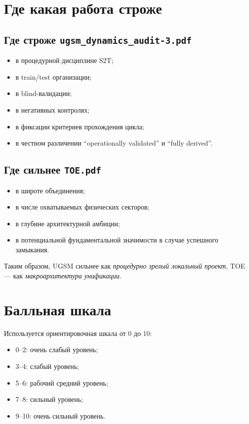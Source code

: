 \documentclass[12pt,a4paper]{article}
\begin{document}
\section{Где какая работа строже}

\subsection{Где строже \texttt{ugsm\_dynamics\_audit-3.pdf}}

\begin{itemize}
    \item в процедурной дисциплине S2T;
    \item в train/test организации;
    \item в blind-валидации;
    \item в негативных контролях;
    \item в фиксации критериев прохождения цикла;
    \item в честном различении ``operationally validated'' и ``fully derived''.
\end{itemize}

\subsection{Где сильнее \texttt{TOE.pdf}}

\begin{itemize}
    \item в широте объединения;
    \item в числе охватываемых физических секторов;
    \item в глубине архитектурной амбиции;
    \item в потенциальной фундаментальной значимости в случае успешного замыкания.
\end{itemize}

Таким образом, UGSM сильнее как \emph{процедурно зрелый локальный проект}, TOE --- как \emph{макроархитектура унификации}.

\section{Балльная шкала}

Используется ориентировочная шкала от 0 до 10:
\begin{itemize}
    \item 0--2: очень слабый уровень;
    \item 3--4: слабый уровень;
    \item 5--6: рабочий средний уровень;
    \item 7--8: сильный уровень;
    \item 9--10: очень сильный уровень.
\end{itemize}
\end{document}
